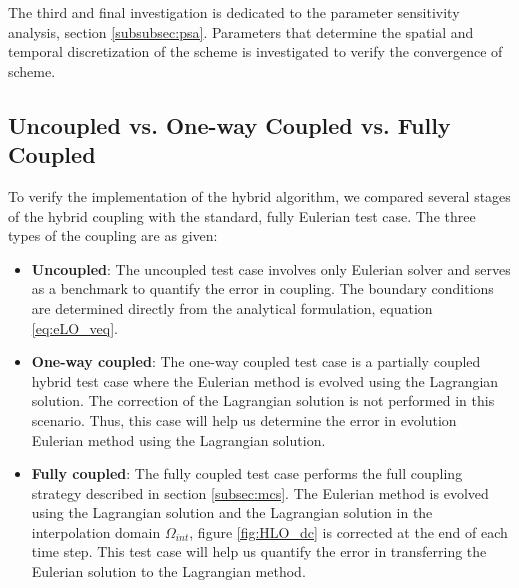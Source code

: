 The third and final investigation is dedicated to the parameter sensitivity analysis, section \ref{subsubsec:psa}. Parameters that determine the spatial and temporal discretization of the scheme is investigated to verify the convergence of scheme.

\subsection{Uncoupled vs. One-way Coupled vs. Fully Coupled}
\label{subsec:UvOvF}
To verify the implementation of the hybrid algorithm, we compared several stages of the hybrid coupling with the standard, fully Eulerian test case. The three types of the coupling are as given:

\begin{itemize}
\item \textbf{Uncoupled}: The uncoupled test case involves only Eulerian solver and serves as a benchmark to quantify the error in coupling. The boundary conditions are determined directly from the analytical formulation, equation 	\ref{eq:eLO_veq}.
\item \textbf{One-way coupled}: The one-way coupled test case is a partially coupled hybrid test case where the Eulerian method is evolved using the Lagrangian solution. The correction of the Lagrangian solution is not performed in this scenario. Thus, this case will help us determine the error in evolution Eulerian method using the Lagrangian solution.
\item \textbf{Fully coupled}: The fully coupled test case performs the full coupling strategy described in section \ref{subsec:mcs}. The Eulerian method is evolved using the Lagrangian solution and the Lagrangian solution in the interpolation domain $\Omega_{int}$, figure \ref{fig:HLO_dc} is corrected at the end of each time step. This test case will help us quantify the error in transferring the Eulerian solution to the Lagrangian method.
\end{itemize}
	

